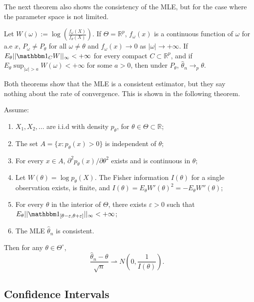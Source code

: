 The next theorem also shows the consistency of the MLE, but for the case
where the parameter space is not limited.

\begin{theorem}
	Let $W(\omega):=\log\left(\frac{f_\omega(X)}{f_\theta(X)}\right)$.
	If $\Theta = \mathbb R^p$, $f_\omega(x)$ is a continuous function
	of $\omega$ for a.e $x$, $P_\omega \neq P_\theta$ for all
	$\omega \neq \theta$ and $f_\omega(x) \to 0$ as $|\omega| \to +\infty$.
	If $E_\theta ||\mathbbm 1_C W||_\infty < +\infty$ for every compact
	$C \subset \mathbb R^p$, and if $E_\theta \sup_{|\omega|>a}W(\omega)<+\infty$
	for some $a>0$, then under $P_\theta$, $\hat \theta_n \to_p \theta$.
\end{theorem}

Both theorems show that the MLE is a consistent estimator, but they say nothing
about the rate of convergence. This is shown in the following theorem.

\begin{theorem}
	Assume:
	\begin{enumerate}
		\item $X_1,X_2,...$ are i.i.d with density $p_\theta$, for $\theta \in \Theta \subset \mathbb R$;
		\item The set $A=\{x: p_\theta(x)>0\}$ is independent of $\theta$;
		\item For every $x \in A$, $\partial^2 p_\theta(x)/\partial\theta^2$ exists and is continuous in $\theta$;
		\item Let $W(\theta) = \log p_\theta(X)$. The Fisher information $I(\theta)$ for a single
		      observation exists, is finite, and $I(\theta) = E_\theta W'(\theta)^2 = -E_\theta W''(\theta)$;
		\item For every $\theta$ in the interior of $\Theta$, there exists $\varepsilon >0$ such
		      that $E_\theta || \mathbbm 1_{[\theta-\varepsilon, \theta+\varepsilon]}||_{\infty}< +\infty$;
		\item The MLE $\hat \theta_n$ is consistent.
	\end{enumerate}

	Then for any $\theta \in \Theta^\circ$,
	\begin{equation}
		\frac{\hat \theta_n - \theta}{\sqrt{n}} \rightharpoonup N\left(0,\frac{1}{I(\theta)}\right).
	\end{equation}
\end{theorem}

\subsection{Confidence Intervals}

